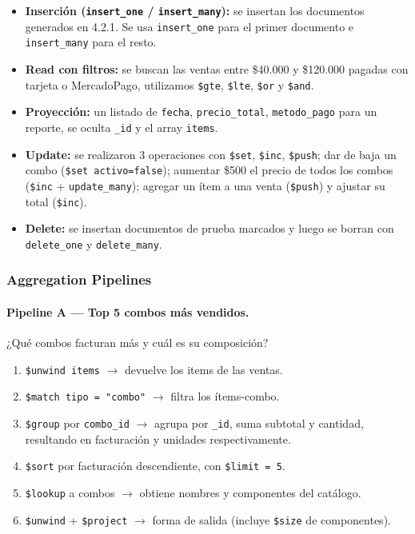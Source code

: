 \documentclass[11pt,a4paper]{article}
\begin{document}
\begin{itemize}[leftmargin=*]
    \item \textbf{Inserción (\texttt{insert\_one} / \texttt{insert\_many}):} se insertan
    los documentos generados en 4.2.1. Se usa \texttt{insert\_one} para el primer documento
    e \texttt{insert\_many} para el resto.
    \item \textbf{Read con filtros:} se buscan las ventas entre \$40.000 y \$120.000 pagadas
    con tarjeta o MercadoPago, utilizamos \texttt{\$gte}, \texttt{\$lte}, \texttt{\$or} y
    \texttt{\$and}.
    \item \textbf{Proyección:} un listado de \texttt{fecha}, \texttt{precio\_total},
    \texttt{metodo\_pago} para un reporte, se oculta \texttt{\_id} y el array
    \texttt{items}.
    \item \textbf{Update:} se realizaron 3 operaciones con \texttt{\$set}, \texttt{\$inc},
    \texttt{\$push}; dar de baja un combo (\texttt{\$set activo=false}); aumentar \$500 el
    precio de todos los combos (\texttt{\$inc} + \texttt{update\_many}); agregar un ítem a
    una venta (\texttt{\$push}) y ajustar su total (\texttt{\$inc}).
    \item \textbf{Delete:} se insertan documentos de prueba marcados y luego se borran con
    \texttt{delete\_one} y \texttt{delete\_many}.
\end{itemize}

\subsubsection{Aggregation Pipelines}

\paragraph{Pipeline A — Top 5 combos más vendidos.} ¿Qué combos facturan más y cuál es su
composición?

\begin{enumerate}[nosep]
    \item \texttt{\$unwind items} $\rightarrow$ devuelve los items de las ventas.
    \item \texttt{\$match tipo = "combo"} $\rightarrow$ filtra los ítems-combo.
    \item \texttt{\$group} por \texttt{combo\_id} $\rightarrow$ agrupa por \texttt{\_id},
    suma subtotal y cantidad, resultando en facturación y unidades respectivamente.
    \item \texttt{\$sort} por facturación descendiente, con \texttt{\$limit = 5}.
    \item \texttt{\$lookup} a combos $\rightarrow$ obtiene nombres y componentes del catálogo.
    \item \texttt{\$unwind} + \texttt{\$project} $\rightarrow$ forma de salida (incluye
    \texttt{\$size} de componentes).
\end{enumerate}
\end{document}
